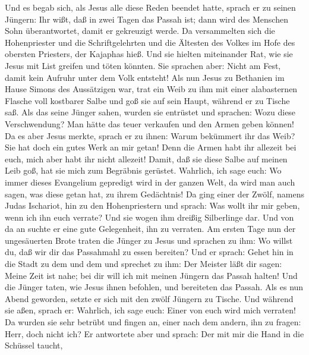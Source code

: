  Und es begab sich, als Jesus alle diese Reden beendet
hatte, sprach er zu seinen Jüngern:  Ihr wißt, daß in zwei
Tagen das Passah ist; dann wird des Menschen Sohn überantwortet, damit
er gekreuzigt werde.  Da versammelten sich die
Hohenpriester und die Schriftgelehrten und die Ältesten des Volkes im
Hofe des obersten Priesters, der Kajaphas hieß.  Und sie
hielten miteinander Rat, wie sie Jesus mit List greifen und töten
könnten.  Sie sprachen aber: Nicht am Fest, damit kein
Aufruhr unter dem Volk entsteht!  Als nun Jesus zu
Bethanien im Hause Simons des Aussätzigen war,  trat ein
Weib zu ihm mit einer alabasternen Flasche voll kostbarer Salbe und goß
sie auf sein Haupt, während er zu Tische saß.  Als das
seine Jünger sahen, wurden sie entrüstet und sprachen: Wozu diese
Verschwendung?  Man hätte das teuer verkaufen und den
Armen geben können!  Da es aber Jesus merkte, sprach er
zu ihnen: Warum bekümmert ihr das Weib? Sie hat doch ein gutes Werk an
mir getan!  Denn die Armen habt ihr allezeit bei euch,
mich aber habt ihr nicht allezeit!  Damit, daß sie diese
Salbe auf meinen Leib goß, hat sie mich zum Begräbnis gerüstet.
 Wahrlich, ich sage euch: Wo immer dieses Evangelium
gepredigt wird in der ganzen Welt, da wird man auch sagen, was diese
getan hat, zu ihrem Gedächtnis!  Da ging einer der Zwölf,
namens Judas Ischariot, hin zu den Hohenpriestern  und
sprach: Was wollt ihr mir geben, wenn ich ihn euch verrate? Und sie
wogen ihm dreißig Silberlinge dar.  Und von da an suchte
er eine gute Gelegenheit, ihn zu verraten.  Am ersten
Tage nun der ungesäuerten Brote traten die Jünger zu Jesus und sprachen
zu ihm: Wo willst du, daß wir dir das Passahmahl zu essen bereiten?
 Und er sprach: Gehet hin in die Stadt zu dem und dem und
sprechet zu ihm: Der Meister läßt dir sagen: Meine Zeit ist nahe; bei
dir will ich mit meinen Jüngern das Passah halten!  Und
die Jünger taten, wie Jesus ihnen befohlen, und bereiteten das Passah.
 Als es nun Abend geworden, setzte er sich mit den zwölf
Jüngern zu Tische.  Und während sie aßen, sprach er:
Wahrlich, ich sage euch: Einer von euch wird mich verraten!
 Da wurden sie sehr betrübt und fingen an, einer nach dem
andern, ihn zu fragen: Herr, doch nicht ich?  Er
antwortete aber und sprach: Der mit mir die Hand in die Schüssel taucht,
